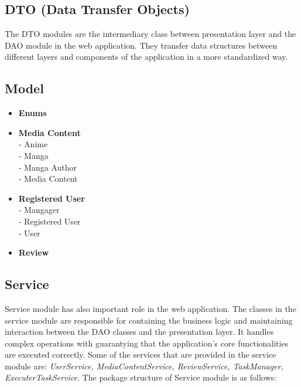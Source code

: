 \vspace{\baselineskip}

\subsection*{DTO (Data Transfer Objects)}
The DTO modules are the intermediary class between presentation layer and the DAO module in the web application.
They transfer data structures between different layers and components of the application in a more standardized way.

\subsection*{Model}
\begin{itemize}
    \item \textbf{Enums}
    \item \textbf{Media Content} \\
    - Anime\\
    - Manga \\
    - Manga Author \\
    - Media Content
    \item \textbf{Registered User}\\
    - Mangager\\
    - Registered User\\
    - User
    \item \textbf{Review} 
\end{itemize}

\subsection*{Service}
Service module has also important role in the web application. The classes in the service module are responsible for containing
the business logic and maintaining interaction between the DAO classes and the presentation layer. 
It handles complex operations with guarantying that the application's core functionalities are executed correctly. Some of the services
that are provided in the service module are: \textit{UserService, MediaContentService, ReviewService, TaskManager, ExecuterTaskService}. The 
package structure of Service module is as follows:


